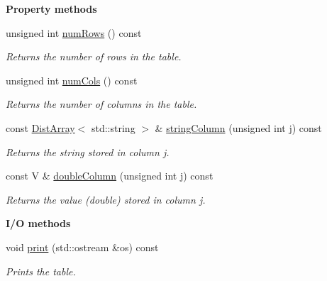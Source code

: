 \begin{Indent}{\bf Property methods}\par
\begin{DoxyCompactItemize}
\item 
unsigned int \hyperlink{class_q_u_e_s_o_1_1_ascii_table_aa764ef68ef1d2ed85a4b6bd4eb0d7b17}{num\-Rows} () const 
\begin{DoxyCompactList}\small\item\em Returns the number of rows in the table. \end{DoxyCompactList}\item 
unsigned int \hyperlink{class_q_u_e_s_o_1_1_ascii_table_a428f547b9f5007e673245c8d2d0be387}{num\-Cols} () const 
\begin{DoxyCompactList}\small\item\em Returns the number of columns in the table. \end{DoxyCompactList}\item 
const \hyperlink{class_q_u_e_s_o_1_1_dist_array}{Dist\-Array}$<$ std\-::string $>$ \& \hyperlink{class_q_u_e_s_o_1_1_ascii_table_a8918d88137629c62e2408c164795479c}{string\-Column} (unsigned int j) const 
\begin{DoxyCompactList}\small\item\em Returns the string stored in column {\ttfamily j}. \end{DoxyCompactList}\item 
const V \& \hyperlink{class_q_u_e_s_o_1_1_ascii_table_a267e1834e60c5df459122b2509e4ca9d}{double\-Column} (unsigned int j) const 
\begin{DoxyCompactList}\small\item\em Returns the value (double) stored in column {\ttfamily j}. \end{DoxyCompactList}\end{DoxyCompactItemize}
\end{Indent}
\begin{Indent}{\bf I/\-O methods}\par
\begin{DoxyCompactItemize}
\item 
void \hyperlink{class_q_u_e_s_o_1_1_ascii_table_a4e58f0ab57b3af3aa4333955175abcf3}{print} (std\-::ostream \&os) const 
\begin{DoxyCompactList}\small\item\em Prints the table. \end{DoxyCompactList}\end{DoxyCompactItemize}
\end{Indent}
